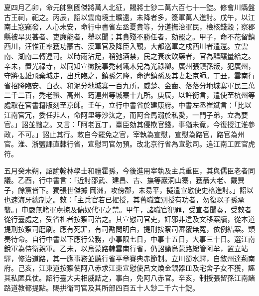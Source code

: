 \begin{pinyinscope}
 夏四月乙卯，命元帥劉國傑將萬人北征，賜將士鈔二萬六百七十一錠。修會川縣盤古王祠，祀之。丙辰，詔以雲南境土曠遠，未降者多，簽軍萬人進討。戊午，以江南土寇竊發，人心未安，命行中書省左丞夏貴等，分道撫治軍民，檢核錢穀；察郡縣被旱災甚者、吏廉能者，舉以聞；其貪殘不勝任者，劾罷之。甲子，命不花留鎮西川，汪惟正率獲功蒙古、漢軍官及降臣入覲，大都巡軍之戍西川者遣還。立雲南、湖南二轉運司。以時雨沾足，稍弛酒禁，民之衰疾飲藥者，官為醖釀量給之。辛未，置光祿寺，以同知宣徽院事禿剌鐵木兒為光祿卿。廣州張鎮孫叛，犯廣州，守將張雄飛棄城走，出兵臨之，鎮孫乞降，命遣鎮孫及其妻赴京師。丁丑，雲南行省招降臨安、白衣、和泥分地城寨一百九所，威楚、金齒、落落分地城寨軍民三萬二千二百，禿老蠻、高州、筠連州等城寨十九所。庚辰，以許衡言，遣使至杭州等處取在官書籍版刻至京師。壬午，立行中書省於建康府。中書左丞崔斌言：「比以江南官冗，委任非人，命阿里等沙汰之，而阿合馬溺於私愛，一門子弟，立為要官。」詔並黜之。又言：「阿老瓦丁，臺臣劾其侵欺官錢，事猶未竟，今復授江淮參政，不可。」詔止其行。敕自今罷免之官，宰執為宣慰，宣慰為路官，路官為州官。淮、浙鹽課直隸行省，宣慰司官勿預。改北京行省為宣慰司。追江南工匠官虎符。



 五月癸未朔，詔諭翰林學士和禮霍孫，今後進用宰執及主兵重臣，其與儒臣老者同議。乙酉，行中書言：「近討邵武、建昌、吉、撫等巖洞山寨，獲聶大老、戴巽子，餘黨皆下。獨張世傑據岡洲，攻傍郡，未易平，擬遣宣慰使史格進討。」詔以也速海牙總制之。敕：「主兵官若已擢授，其舊職宜別授有功者，勿復以子孫承襲。」申嚴無籍軍虜掠及傭奴代軍之禁。甲午，諸職官犯罪，受宣者聞奏，受敕者從行臺處之，受省札者按察司治之。其宣慰司官吏，奸邪非違及文移案牘，從本道提刑按察司磨刷。應有死罪，有司勘問明白，提刑按察司審覆無冤，依例結案。類奏待命。自行中書以下應行公務，小事限七日，中事十五日，大事三十日。選江南銳軍為侍衛親軍。乙未，以烏蒙路隸雲南行省，仍詔諭烏蒙路總管阿牟，置立站驛，修治道路，其一應事務並聽行省平章賽典赤節制。立川蜀水驛，自敘州達荊南府。己亥，江東道按察使阿八赤求江東宣慰使呂文煥金銀器皿及宅舍子女不獲，誣其私匿兵仗。詔行臺大夫相威詰之，事白，免阿八赤官。辛亥，制授張留孫江南諸路道教都提點。賜拱衛司官及其所部四百五十人鈔二千六十錠。




\end{pinyinscope}
